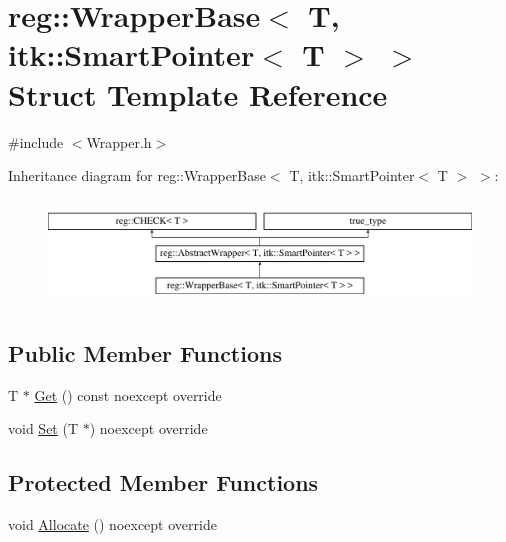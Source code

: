 \hypertarget{structreg_1_1_wrapper_base_3_01_t_00_01itk_1_1_smart_pointer_3_01_t_01_4_01_4}{}\section{reg\+:\+:Wrapper\+Base$<$ T, itk\+:\+:Smart\+Pointer$<$ T $>$ $>$ Struct Template Reference}
\label{structreg_1_1_wrapper_base_3_01_t_00_01itk_1_1_smart_pointer_3_01_t_01_4_01_4}


{\ttfamily \#include $<$Wrapper.\+h$>$}

Inheritance diagram for reg\+:\+:Wrapper\+Base$<$ T, itk\+:\+:Smart\+Pointer$<$ T $>$ $>$\+:\begin{figure}[H]
\begin{center}
\leavevmode
\includegraphics[height=2.781457cm]{structreg_1_1_wrapper_base_3_01_t_00_01itk_1_1_smart_pointer_3_01_t_01_4_01_4}
\end{center}
\end{figure}
\subsection*{Public Member Functions}
\begin{DoxyCompactItemize}
\item 
T $\ast$ \hyperlink{structreg_1_1_wrapper_base_3_01_t_00_01itk_1_1_smart_pointer_3_01_t_01_4_01_4_ac2d57c43556c87aa45dcafd2c8a9cb47}{Get} () const noexcept override
\item 
void \hyperlink{structreg_1_1_wrapper_base_3_01_t_00_01itk_1_1_smart_pointer_3_01_t_01_4_01_4_a9a9bcfbe7236f66cb355f929aeeca281}{Set} (T $\ast$) noexcept override
\end{DoxyCompactItemize}
\subsection*{Protected Member Functions}
\begin{DoxyCompactItemize}
\item 
void \hyperlink{structreg_1_1_wrapper_base_3_01_t_00_01itk_1_1_smart_pointer_3_01_t_01_4_01_4_a10fb689e5da772970c04d312d600868d}{Allocate} () noexcept override
\end{DoxyCompactItemize}
